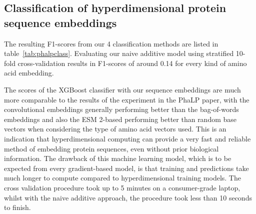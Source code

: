 \subsection*{Classification of hyperdimensional protein sequence embeddings}
The resulting F1-scores from our 4 classification methods are listed in table~\ref{tab:phalpclass}. Evaluating our naive additive model using stratified 10-fold cross-validation results in F1-scores of around 0.14 for every kind of amino acid embedding.

\begin{table}[h]
    \caption{\label{tab:phalpclass}Results of type classifications using the principal classification technique of hyperdimensional computing, an XGBoost classifier and OnlineHD implementations with several kinds of embeddings}
\end{table}

The scores of the XGBoost classifier with our sequence embeddings are much more comparable to the results of the experiment in the PhaLP paper, with the convolutional embeddings generally performing better than the bag-of-words embeddings and also the ESM 2-based performing better than random base vectors when considering the type of amino acid vectors used. This is an indication that hyperdimensional computing can provide a very fast and reliable method of embedding protein sequences, even without prior biological information. The drawback of this machine learning model, which is to be expected from every gradient-based model, is that training and predictions take much longer to compute compared to hyperdimensional training models. The cross validation procedure took up to 5 minutes on a consumer-grade laptop, whilst with the naive additive approach, the procedure took less than 10 seconds to finish.

